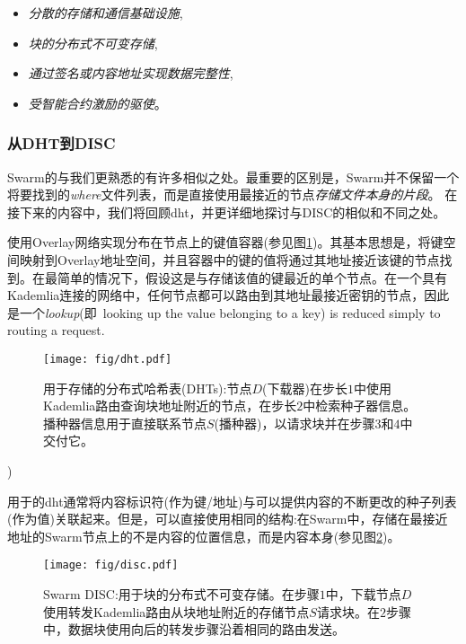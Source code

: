 \begin{itemize}
\item \emph{分散的存储和通信基础设施}, 
\item \emph{块的分布式不可变存储}, 
\item \emph{通过签名或内容地址实现数据完整性},
\item \emph{受智能合约激励的驱使}。 

\end{itemize}
 
\subsubsection{从DHT到DISC}
Swarm的与我们更熟悉的有许多相似之处。最重要的区别是，Swarm并不保留一个将要找到的\emph{where}文件列表，而是直接使用最接近的节点\emph{存储文件本身的片段}。
在接下来的内容中，我们将回顾dht，并更详细地探讨与DISC的相似和不同之处。 
 
使用Overlay网络实现分布在节点上的键值容器(参见图\ref{fig:DHT})。其基本思想是，将键空间映射到Overlay地址空间，并且容器中的键的值将通过其地址接近该键的节点找到。在最简单的情况下，假设这是与存储该值的键最近的单个节点。在一个具有Kademlia连接的网络中，任何节点都可以路由到其地址最接近密钥的节点，因此是一个\emph{lookup}(即\ looking up the value belonging to a key) is reduced simply to routing a request.\begin{figure}[htbp]
   \centering
   \texttt{[image: fig/dht.pdf]}
   \caption[分布式哈希表(dht) \statusgreen]{用于存储的分布式哈希表(DHTs):节点$D$(下载器)在步长$1$中使用Kademlia路由查询块地址附近的节点，在步长$2$中检索种子器信息。播种器信息用于直接联系节点$S$(播种器)，以请求块并在步骤$3$和$4$中交付它。}
   \label{fig:DHT}
\end{figure})

用于的dht通常将内容标识符(作为键/地址)与可以提供内容\cite{ipfs2014, crosby2007analysis}的不断更改的种子列表(作为值)关联起来。但是，可以直接使用相同的结构:在Swarm中，存储在最接近地址的Swarm节点上的不是内容的位置信息，而是内容本身(参见图\ref{fig:disc})。 


\begin{figure}[htbp]
   \centering
   \texttt{[image: fig/disc.pdf]}
   \caption[Swarm DISC:分布式不可变存储块\statusgreen]{Swarm DISC:用于块的分布式不可变存储。在步骤$1$中，下载节点$D$使用转发Kademlia路由从块地址附近的存储节点$S$请求块。在$2$步骤中，数据块使用向后的转发步骤沿着相同的路由发送。   }
   \label{fig:disc}
\end{figure}

